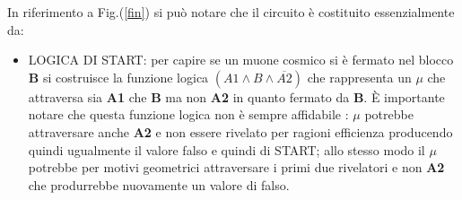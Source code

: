 \documentclass[12pt,a4paper,openright,twoside]{article}
\numberwithin{equation}{section} %
\begin{document}
In riferimento a Fig.(\ref{fin}) si può notare che il circuito è costituito essenzialmente da:
\begin{itemize}
\item LOGICA DI START: per capire se un muone cosmico si è fermato nel blocco \textbf{B} si costruisce la funzione logica $(A1 \wedge B \wedge \overline{A2})$ che rappresenta un $\mu$ che attraversa sia \textbf{A1} che \textbf{B} ma non \textbf{A2} in quanto fermato da \textbf{B}.
È importante notare che questa funzione logica non è sempre affidabile : $\mu$ potrebbe attraversare anche \textbf{A2} e non essere rivelato per ragioni efficienza producendo quindi ugualmente il valore falso e quindi di START; allo stesso modo il $\mu$ potrebbe per motivi geometrici attraversare i primi due rivelatori e non \textbf{A2} che produrrebbe nuovamente un valore di falso.


\end{itemize}
\end{document}
